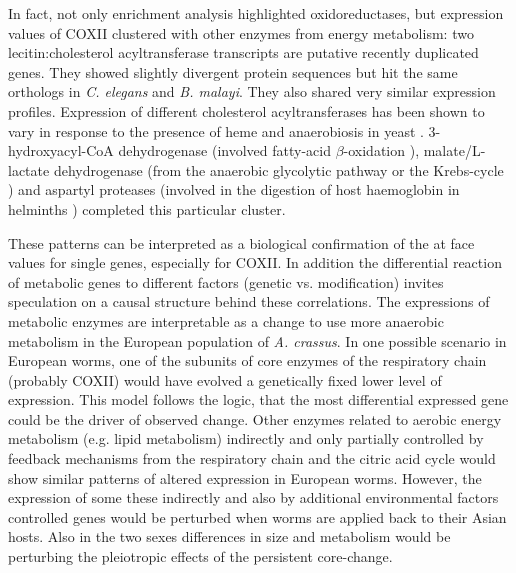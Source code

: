 In fact, not only enrichment analysis highlighted oxidoreductases, but
expression values of COXII clustered with other enzymes from energy
metabolism: two lecitin:cholesterol acyltransferase transcripts are
putative recently duplicated genes. They showed slightly divergent
protein sequences but hit the same orthologs in \textit{C. elegans}
and \textit{B. malayi}. They also shared very similar expression
profiles. Expression of different cholesterol acyltransferases has
been shown to vary in response to the presence of heme and
anaerobiosis in yeast \cite{pmid11786267}. 3-hydroxyacyl-CoA
dehydrogenase (involved fatty-acid $\beta$-oxidation
\cite{pmid8454629}), malate/L-lactate dehydrogenase (from the
anaerobic glycolytic pathway or the Krebs-cycle
\cite{sturm1969vergleichende}) and aspartyl proteases (involved in the
digestion of host haemoglobin in helminths \cite{pmid12782060})
completed this particular cluster.

These patterns can be interpreted as a biological confirmation of the
at face values for single genes, especially for COXII. In addition the
differential reaction of metabolic genes to different factors (genetic
vs. modification) invites speculation on a causal structure behind
these correlations. The expressions of metabolic enzymes are
interpretable as a change to use more anaerobic metabolism in the
European population of \textit{A. crassus}. In one possible scenario
in European worms, one of the subunits of core enzymes of the
respiratory chain (probably COXII) would have evolved a genetically
fixed lower level of expression. This model follows the logic, that
the most differential expressed gene could be the driver of observed
change. Other enzymes related to aerobic energy metabolism (e.g. lipid
metabolism) indirectly and only partially controlled by feedback
mechanisms from the respiratory chain and the citric acid cycle would
show similar patterns of altered expression in European
worms. However, the expression of some these indirectly and also by
additional environmental factors controlled genes would be perturbed
when worms are applied back to their Asian hosts. Also in the two
sexes differences in size and metabolism would be perturbing the
pleiotropic effects of the persistent core-change.


